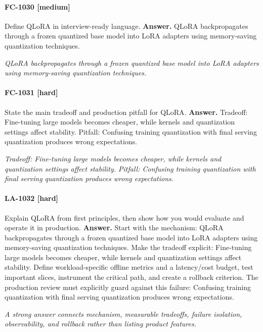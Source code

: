 \paragraph{FC-1030 [medium]} Define QLoRA in interview-ready language.
\noindent\textbf{Answer.} QLoRA backpropagates through a frozen quantized base model into LoRA adapters using memory-saving quantization techniques.
\par\textit{QLoRA backpropagates through a frozen quantized base model into LoRA adapters using memory-saving quantization techniques.}
\paragraph{FC-1031 [hard]} State the main tradeoff and production pitfall for QLoRA.
\noindent\textbf{Answer.} Tradeoff: Fine-tuning large models becomes cheaper, while kernels and quantization settings affect stability. Pitfall: Confusing training quantization with final serving quantization produces wrong expectations.
\par\textit{Tradeoff: Fine-tuning large models becomes cheaper, while kernels and quantization settings affect stability. Pitfall: Confusing training quantization with final serving quantization produces wrong expectations.}
\paragraph{LA-1032 [hard]} Explain QLoRA from first principles, then show how you would evaluate and operate it in production.
\noindent\textbf{Answer.} Start with the mechanism: QLoRA backpropagates through a frozen quantized base model into LoRA adapters using memory-saving quantization techniques. Make the tradeoff explicit: Fine-tuning large models becomes cheaper, while kernels and quantization settings affect stability. Define workload-specific offline metrics and a latency/cost budget, test important slices, instrument the critical path, and create a rollback criterion. The production review must explicitly guard against this failure: Confusing training quantization with final serving quantization produces wrong expectations.
\par\textit{A strong answer connects mechanism, measurable tradeoffs, failure isolation, observability, and rollback rather than listing product features.}
